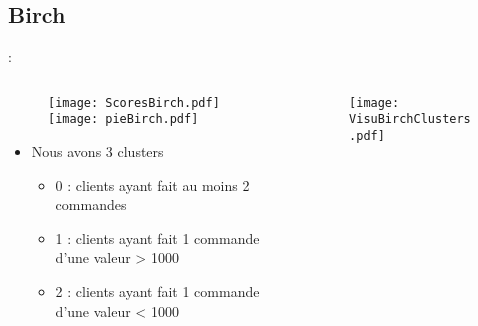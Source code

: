 \documentclass[8pt,aspectratio=169,hyperref={unicode=true}]{beamer}
\begin{document}
\subsection{Birch}
\begin{frame}{\insertsection: \insertsubsection}
    \begin{columns}
        \begin{column}{.55\textwidth}
            \begin{figure}
                \hfill
                \texttt{[image: ScoresBirch.pdf]}
                \hfill
                \texttt{[image: pieBirch.pdf]}
                \hfill
            \end{figure}
            \begin{itemize}
                \footnotesize
                \item Nous avons 3 clusters
                      \begin{itemize}
                          \scriptsize
                          \item 0 : clients ayant fait au moins 2 commandes
                          \item 1 : clients ayant fait 1 commande d'une valeur > 1000
                          \item 2 : clients ayant fait 1 commande d'une valeur < 1000
                      \end{itemize}
            \end{itemize}
        \end{column}
        \begin{column}{.45\textwidth}
            \begin{figure}
                \texttt{[image: VisuBirchClusters.pdf]}
            \end{figure}
        \end{column}
    \end{columns}
\end{frame}
\end{document}
